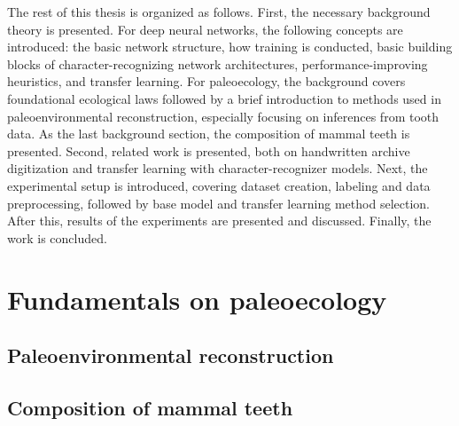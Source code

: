 \documentclass{article}
\begin{document}
The rest of this thesis is organized as follows. First, the necessary background theory is 
presented. For deep neural networks, the following concepts are introduced:
the basic network structure, how training is conducted, basic building blocks of character-recognizing network architectures, performance-improving 
heuristics, and transfer learning. For paleoecology, the background covers 
foundational ecological laws followed by a brief introduction to methods used in
paleoenvironmental reconstruction, especially focusing on inferences from tooth data.
As the last background section, the composition of mammal teeth is presented. 
Second, related work is presented, both on
handwritten archive digitization and transfer learning with character-recognizer models.
Next, the experimental setup is introduced, covering dataset creation, labeling and data 
preprocessing, followed by base model and transfer learning method selection. After this, 
results of the experiments are presented and discussed. Finally, the work is concluded.

\section{Fundamentals on paleoecology}

\subsection{Paleoenvironmental reconstruction}

\subsection{Composition of mammal teeth}
\label{sect:mammal_teeth}

\end{document}
